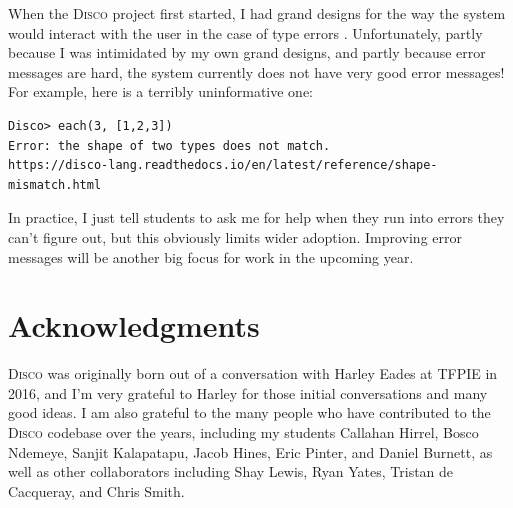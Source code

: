 \documentclass[copyright,creativecommons,12pt]{eptcs}
\newcommand{\disco}{\textsc{Disco}\xspace}
\begin{document}
When the \disco project first started, I had grand designs for the way
the system would interact with the user in the case of type errors
\cite{yorgey2018explaining}. Unfortunately, partly because I was
intimidated by my own grand designs, and partly because error messages
are hard, the system currently does not have very good error messages!
For example, here is a terribly uninformative one:
\begin{verbatim}
Disco> each(3, [1,2,3])
Error: the shape of two types does not match.
https://disco-lang.readthedocs.io/en/latest/reference/shape-mismatch.html
\end{verbatim}
In practice, I just tell students to ask me for help when they run
into errors they can't figure out, but this obviously limits wider
adoption.  Improving error messages will be another big focus for work
in the upcoming year.

\section{Acknowledgments}
\label{sec:acks}

\disco was originally born out of a conversation with Harley Eades at
TFPIE in 2016, and I'm very grateful to Harley for those initial
conversations and many good ideas.  I am also grateful to the many
people who have contributed to the \disco codebase over the years,
including my students Callahan Hirrel, Bosco Ndemeye, Sanjit
Kalapatapu, Jacob Hines, Eric Pinter, and Daniel Burnett, as well as
other collaborators including Shay Lewis, Ryan Yates, Tristan de
Cacqueray, and Chris Smith.



\end{document}

